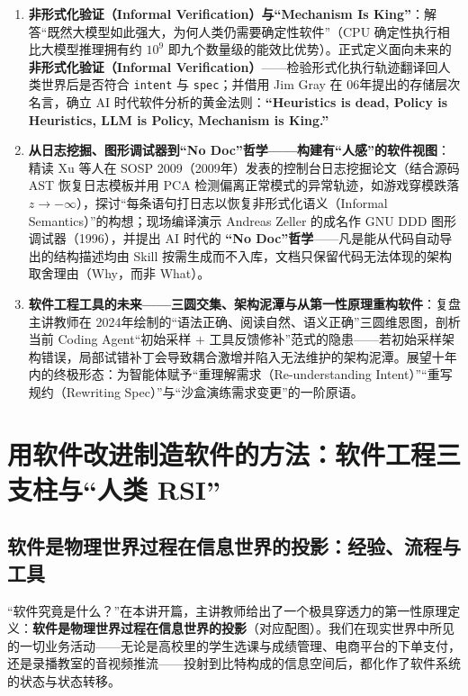 \documentclass[a4paper]{article}
\begin{document}
\begin{enumerate}
    \item \textbf{非形式化验证（Informal Verification）与“Mechanism Is King”}：解答“既然大模型如此强大，为何人类仍需要确定性软件”（CPU 确定性执行相比大模型推理拥有约 $10^9$ 即九个数量级的能效比优势）。正式定义面向未来的\textbf{非形式化验证（Informal Verification）}——检验形式化执行轨迹翻译回人类世界后是否符合 \texttt{intent} 与 \texttt{spec}；并借用 Jim Gray 在 06年提出的存储层次名言，确立 AI 时代软件分析的黄金法则：\textbf{``Heuristics is dead, Policy is Heuristics, LLM is Policy, Mechanism is King.''}
    \item \textbf{从日志挖掘、图形调试器到“No Doc”哲学——构建有“人感”的软件视图}：精读 Xu 等人在 SOSP 2009（2009年）发表的控制台日志挖掘论文（结合源码 AST 恢复日志模板并用 PCA 检测偏离正常模式的异常轨迹，如游戏穿模跌落 $z \to -\infty$），探讨“每条语句打日志以恢复非形式化语义（Informal Semantics）”的构想；现场编译演示 Andreas Zeller 的成名作 GNU DDD 图形调试器（1996），并提出 AI 时代的 \textbf{“No Doc”哲学}——凡是能从代码自动导出的结构描述均由 Skill 按需生成而不入库，文档只保留代码无法体现的架构取舍理由（Why，而非 What）。
    \item \textbf{软件工程工具的未来——三圆交集、架构泥潭与从第一性原理重构软件}：复盘主讲教师在 2024年绘制的“语法正确、阅读自然、语义正确”三圆维恩图，剖析当前 Coding Agent“初始采样 $+$ 工具反馈修补”范式的隐患——若初始采样架构错误，局部试错补丁会导致耦合激增并陷入无法维护的架构泥潭。展望十年内的终极形态：为智能体赋予“重理解需求（Re-understanding Intent）”“重写规约（Rewriting Spec）”与“沙盒演练需求变更”的一阶原语。
\end{enumerate}

\newpage
\tableofcontents
\newpage

\section{用软件改进制造软件的方法：软件工程三支柱与“人类 RSI”}

\subsection{软件是物理世界过程在信息世界的投影：经验、流程与工具}

“软件究竟是什么？”在本讲开篇，主讲教师给出了一个极具穿透力的第一性原理定义：\textbf{软件是物理世界过程在信息世界的投影}（对应配图）。我们在现实世界中所见的一切业务活动——无论是高校里的学生选课与成绩管理、电商平台的下单支付，还是录播教室的音视频推流——投射到比特构成的信息空间后，都化作了软件系统的状态与状态转移。
\end{document}
